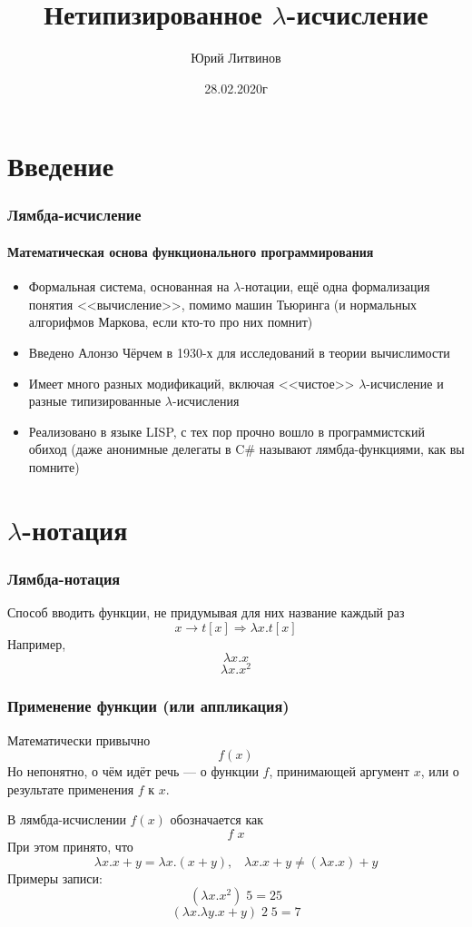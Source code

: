 \documentclass[xetex,mathserif,serif]{beamer}
\title{Нетипизированное $\lambda$-исчисление}
\author{Юрий Литвинов}
\date{28.02.2020г}
\begin{document}
	
	\frame{\titlepage}

	\section{Введение}
	
	\begin{frame}
		\frametitle{Лямбда-исчисление}
		\framesubtitle{Математическая основа функционального программирования}
		\begin{itemize}
			\item Формальная система, основанная на $\lambda$-нотации, ещё одна формализация
					понятия <<вычисление>>, помимо машин Тьюринга (и нормальных алгорифмов
					Маркова, если кто-то про них помнит)
			\item Введено Алонзо Чёрчем в 1930-х для исследований в теории вычислимости
			\item Имеет много разных модификаций, включая <<чистое>> $\lambda$-исчисление и
					разные типизированные $\lambda$-исчисления
			\item Реализовано в языке LISP, с тех пор прочно вошло в программистский обиход
					(даже анонимные делегаты в C\# называют лямбда-функциями, как вы помните)
		\end{itemize}
	\end{frame}
		
	\section{$\lambda$-нотация}
		
	\begin{frame}
		\frametitle{Лямбда-нотация}
		Способ вводить функции, не придумывая для них название каждый раз
		$$x \rightarrow t[x] \Longrightarrow \lambda x.t[x]$$
		Например,
		$$\lambda x.x$$
		$$\lambda x.x^2$$
	\end{frame}

	\begin{frame}
		\frametitle{Применение функции (или аппликация)}
		Математически привычно
		$$f(x)$$
		Но непонятно, о чём идёт речь --- о функции $f$, принимающей аргумент $x$, или о результате применения
		$f$ к $x$. 

		В лямбда-исчислении $f(x)$ обозначается как
		$$f \; x$$
		При этом принято, что
		$$\lambda x. x + y = \lambda x.(x + y), \;\;\; 
		\lambda x. x + y \neq (\lambda x.x) + y$$
		Примеры записи:
		$$(\lambda x.x^2) \; 5 = 25$$
		$$(\lambda x.\lambda y.x + y) \; 2 \; 5 = 7$$
	\end{frame}
\end{document}
